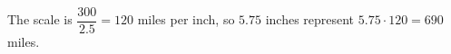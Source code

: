 The scale is $\dfrac{300}{2.5}=120$ miles per inch, so $5.75$ inches represent $5.75\cdot120=\boxed{690}$ miles.

